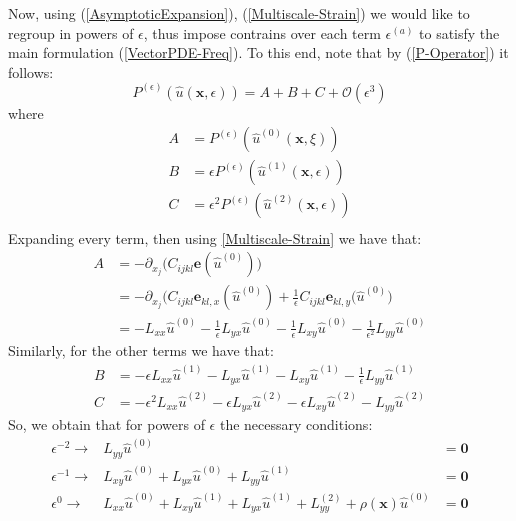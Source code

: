 Now, using (\ref{AsymptoticExpansion}), (\ref{Multiscale-Strain}) we would like to regroup in powers of $\epsilon$, thus impose contrains over each term $\epsilon^{(a)}$ to satisfy the main formulation (\ref{VectorPDE-Freq}). To this end, note that by (\ref{P-Operator}) it follows:
\begin{equation*}
    P^{(\epsilon)}(\hat{u}(\mathbf{x},\epsilon)) = A + B + C + \mathcal{O}(\epsilon^3)
\end{equation*}
where 
\begin{equation*}
    \begin{array}{cc}
        A &= P^{(\epsilon)}(\hat{u}^{(0)}(\mathbf{x},\xi)) \\
        B &= \epsilon P^{(\epsilon)}(\hat{u}^{(1)}(\mathbf{x},\epsilon)) \\
        C &= \epsilon^2 P^{(\epsilon)}(\hat{u}^{(2)}(\mathbf{x},\epsilon)) \\
    \end{array}
\end{equation*}
Expanding every term, then using \ref{Multiscale-Strain} we have that:
\begin{align*}
    A &= - \partial_{x_j} \big( C_{ijkl}\mathbf{e}(\hat{u}^{(0)}) \big) \\
    &=- \partial_{x_j} \big( C_{ijkl} \mathbf{e}_{kl,x} (\hat{u}^{(0)}) + \frac{1}{\epsilon}C_{ijkl}\mathbf{e}_{kl,y}(\hat{u}^{(0)} \big)\\
    &= - L_{xx}\hat{u}^{(0)} - \frac{1}{\epsilon} L_{yx}\hat{u}^{(0)} - \frac{1}{\epsilon} L_{xy}\hat{u}^{(0)} - \frac{1}{\epsilon^2}L_{yy}\hat{u}^{(0)}
\end{align*}
Similarly, for the other terms we have that:
\begin{align*}
    B &= -\epsilon L_{xx} \hat{u}^{(1)} - L_{yx}\hat{u}^{(1)} - L_{xy} \hat{u}^{(1)} - \frac{1}{\epsilon} L_{yy}\hat{u}^{(1)} \\
    C &= -\epsilon^2 L_{xx} \hat{u}^{(2)} - \epsilon L_{yx}\hat{u}^{(2)} - \epsilon L_{xy} \hat{u}^{(2)} - L_{yy}\hat{u}^{(2)} 
\end{align*}
So, we obtain that for powers of $\epsilon$ the necessary conditions:
\begin{equation}
    \label{Epsilon-Separation}
    \begin{array}{ccc}
        \epsilon^{-2} \longrightarrow & L_{yy} \hat{u}^{(0)} &= \mathbf{0} \\
        \epsilon^{-1} \longrightarrow & L_{xy}\hat{u}^{(0)} + L_{yx}\hat{u}^{(0)} + L_{yy}\hat{u}^{(1)} &= \mathbf{0} \\
        \epsilon^{0} \longrightarrow & L_{xx}\hat{u}^{(0)} + L_{xy} \hat{u}^{(1)} + L_{yx}\hat{u}^{(1)} + L_{yy}^{(2)} + \rho(\mathbf{x}) \hat{u}^{(0)} &= \mathbf{0}
    \end{array}
\end{equation}

